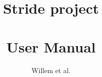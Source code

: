 \documentclass[a4paper,11pt]{report}
\title{Stride project \\ \\ User Manual}
\author{Willem et al. }
\begin{document}
\frontpages

\mainbodypages






%

\backpages
\end{document}
